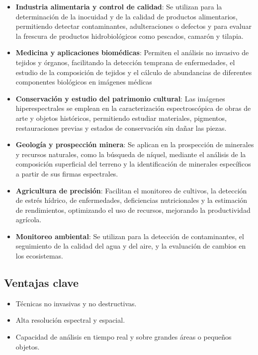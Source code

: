\begin{itemize}
    \item \textbf{Industria alimentaria y control de calidad}:
Se utilizan para la determinación de la inocuidad y de la calidad de productos alimentarios, permitiendo detectar contaminantes, adulteraciones o defectos y para evaluar la frescura de productos hidrobiológicos como pescados, camarón y tilapia.

    \item \textbf{Medicina y aplicaciones biomédicas}:
Permiten el análisis no invasivo de tejidos y órganos, facilitando la detección temprana de enfermedades, el estudio de la composición de tejidos y el cálculo de abundancias de diferentes componentes biológicos en imágenes médicas

    \item \textbf{Conservación y estudio del patrimonio cultural}:
Las imágenes hiperespectrales se emplean en la caracterización espectroscópica de obras de arte y objetos históricos, permitiendo estudiar materiales, pigmentos, restauraciones previas y estados de conservación sin dañar las piezas.

    \item \textbf{Geología y prospección minera}:
Se aplican en la prospección de minerales y recursos naturales, como la búsqueda de níquel, mediante el análisis de la composición superficial del terreno y la identificación de minerales específicos a partir de sus firmas espectrales.

    \item \textbf{Agricultura de precisión}:
Facilitan el monitoreo de cultivos, la  detección de estrés hídrico, de enfermedades, deficiencias nutricionales y la estimación de rendimientos, optimizando el uso de recursos,  mejorando la productividad agrícola.

    \item \textbf{Monitoreo ambiental}:
Se utilizan para la detección de contaminantes, el seguimiento de la calidad del agua y del aire, y la evaluación de cambios en los ecosistemas.
\end{itemize}

\subsection{Ventajas clave}

\begin{itemize}
    \item Técnicas no invasivas y no destructivas.
    \item Alta resolución espectral y espacial.
    \item Capacidad de análisis en tiempo real y sobre grandes áreas o pequeños objetos.
\end{itemize}



